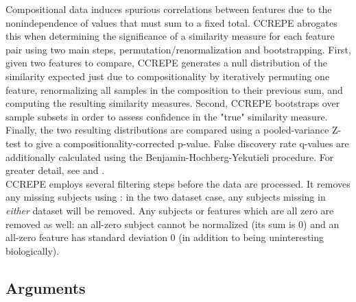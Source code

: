\documentclass{article}\usepackage[]{graphicx}\usepackage[usenames,dvipsnames]{color}
\begin{document}
Compositional data induces spurious correlations between features due to the nonindependence of values that must sum to a fixed total.  CCREPE abrogates this when determining the significance of a similarity measure for each feature pair using two main steps, permutation/renormalization and bootstrapping.  First, given two features to compare, CCREPE generates a null distribution of the similarity expected just due to compositionality by iteratively permuting one feature, renormalizing all samples in the composition to their previous sum, and computing the resulting similarity measures.  Second, CCREPE bootstraps over sample subsets in order to assess confidence in the "true" similarity measure.  Finally, the two resulting distributions are compared using a pooled-variance Z-test to give a compositionality-corrected p-value.  False discovery rate q-values are additionally calculated using the Benjamin-Hochberg-Yekutieli procedure.  For greater detail, see \citet{faust2012microbial} and \citet{schwager2012unpublished}.\\

CCREPE employs several filtering steps before the data are processed.  It removes any missing subjects using : in the two dataset case, any subjects missing in \emph{either} dataset will be removed.  Any subjects or features which are all zero are removed as well: an all-zero subject cannot be normalized (its sum is 0) and an all-zero feature has standard deviation 0 (in addition to being uninteresting biologically).

\subsection{Arguments}
\end{document}
